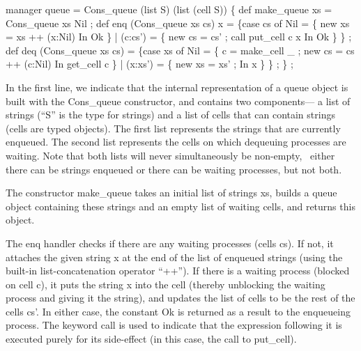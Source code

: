\beginid
manager queue = Cons\_queue (list S)             %
                           (list (cell S))      %
\{
    def make\_queue xs = Cons\_queue xs Nil ;
\null
    def enq (Cons\_queue xs cs) x =              %
        \{case cs of
           Nil     = \{ new xs = xs ++ (x:Nil)   %
                     In
                       Ok \}
         | (c:cs') = \{ new cs = cs' ;
                       call put\_cell c x        %
                     In                         %
                       Ok \} \} ;
\null
    def deq (Cons\_queue xs cs) =
        \{case xs of
           Nil     = \{ c = make\_cell \_ ;        %
                       new cs = cs ++ (c:Nil)   %
                     In
                       get\_cell c  \}            %
         | (x:xs') = \{ new xs = xs' ;
                     In
                       x \} \} ;
\} ;
\endid

In the first line, we indicate that the internal representation of a
queue object is built with the {\cf Cons\_queue} constructor, and
contains two components--- a list of strings (``{\cf S}'' is the type
for strings) and a list of cells that can contain strings (cells are
typed objects).  The first list represents the strings that are
currently enqueued.  The second list represents the cells on which
dequeuing processes are waiting.  Note that both lists will never
simultaneously be non-empty, \ie\ either there can be strings enqueued
or there can be waiting processes, but not both.

The constructor {\cf make\_queue} takes an initial list of strings
{\cf xs}, builds a queue object containing these strings and an empty
list of waiting cells, and returns this object.

The {\cf enq} handler checks if there are any waiting processes (cells
{\cf cs}). If not, it attaches the given string {\cf x} at the end of
the list of enqueued strings (using the built-in list-concatenation
operator ``{\cf ++}'').  If there is a waiting process (blocked on
cell {\cf c}), it puts the string {\cf x} into the cell (thereby
unblocking the waiting process and giving it the string), and updates
the list of cells to be the rest of the cells {\cf cs'}.  In either
case, the constant {\cf Ok} is returned as a result to the enqueueing
process.  The keyword {\cf call} is used to indicate that the
expression following it is executed purely for its side-effect (in
this case, the call to {\cf put\_cell}).

